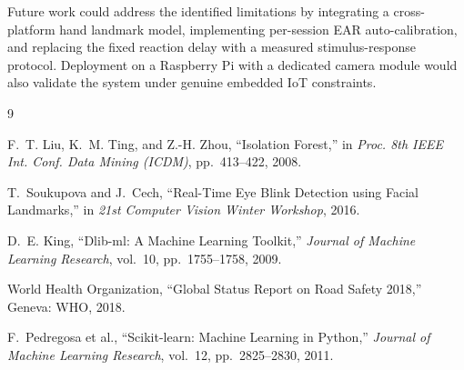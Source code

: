 \documentclass[12pt, a4paper]{article}
\begin{document}
Future work could address the identified limitations by integrating a
cross-platform hand landmark model, implementing per-session EAR auto-calibration,
and replacing the fixed reaction delay with a measured stimulus-response protocol.
Deployment on a Raspberry Pi with a dedicated camera module would also
validate the system under genuine embedded IoT constraints.
\newpage
\newpage
\begin{thebibliography}{9}

F.~T. Liu, K.~M. Ting, and Z.-H. Zhou,
``Isolation Forest,''
in \textit{Proc. 8th IEEE Int. Conf. Data Mining (ICDM)},
pp.~413--422, 2008.

T.~Soukupova and J.~Cech,
``Real-Time Eye Blink Detection using Facial Landmarks,''
in \textit{21st Computer Vision Winter Workshop}, 2016.

D.~E. King,
``Dlib-ml: A Machine Learning Toolkit,''
\textit{Journal of Machine Learning Research}, vol.~10,
pp.~1755--1758, 2009.

World Health Organization,
``Global Status Report on Road Safety 2018,''
Geneva: WHO, 2018.

F.~Pedregosa et al.,
``Scikit-learn: Machine Learning in Python,''
\textit{Journal of Machine Learning Research}, vol.~12,
pp.~2825--2830, 2011.

\end{thebibliography}
\end{document}
